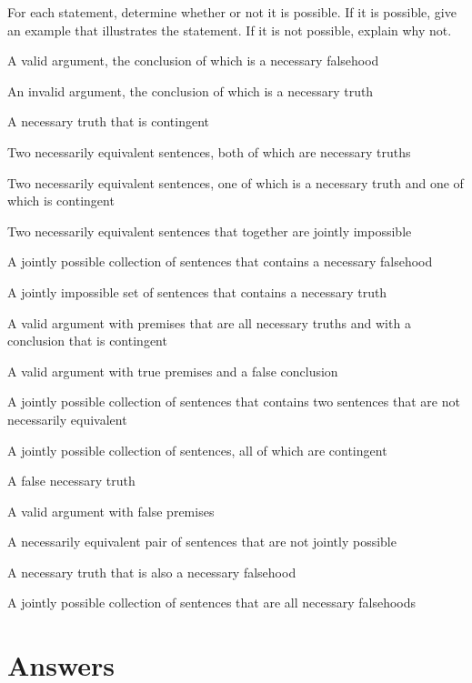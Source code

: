 \problempart
\label{pr.EnglishCombinations2}
For each statement, determine whether or not it is possible. If it is possible, give an example that illustrates the statement. If it is not possible, explain why not.
\begin{earg}
\item A valid argument, the conclusion of which is a necessary falsehood
\item An invalid argument, the conclusion of which is a necessary truth
\item A necessary truth that is contingent
\item Two necessarily equivalent sentences, both of which are necessary truths
\item Two necessarily equivalent sentences, one of which is a necessary truth and one of which is contingent
\item Two necessarily equivalent sentences that together are jointly impossible
\item A jointly possible collection of sentences that contains a necessary falsehood
\item A jointly impossible set of sentences that contains a necessary truth

\item A valid argument with premises that are all necessary truths and with a conclusion that is contingent
\item A valid argument with true premises and a false conclusion
\item A jointly possible collection of sentences that contains two sentences that are not necessarily equivalent
\item A jointly possible collection of sentences, all of which are contingent
\item A false necessary truth
\item A valid argument with false premises
\item A necessarily equivalent pair of sentences that are not jointly possible
\item A necessary truth that is also a necessary falsehood
\item A jointly possible collection of sentences that are all necessary falsehoods
\end{earg}



\section{Answers}
\setcounter{ProbPart}{0}


